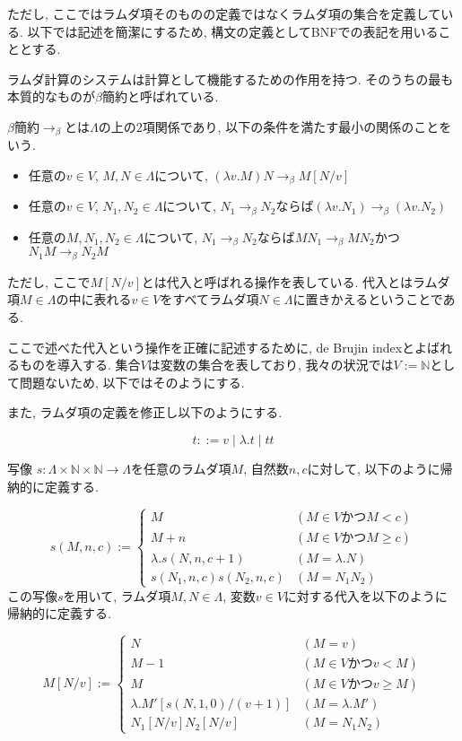 \documentclass[12pt, titlepage]{ltjsarticle}
\begin{document}
ただし, ここではラムダ項そのものの定義ではなくラムダ項の集合を定義している. 以下では記述を簡潔にするため, 構文の定義としてBNFでの表記を用いることとする.

ラムダ計算のシステムは計算として機能するための作用を持つ. そのうちの最も本質的なものが$\beta$簡約と呼ばれている.

\begin{defn}
 $\beta$簡約$\rightarrow_{\beta}$とは$\Lambda$の上の$2$項関係であり, 以下の条件を満たす最小の関係のことをいう.
 \begin{itemize}
  \item 任意の$v \in V$, $M, N \in \Lambda$について, $(\lambda v. M) N \rightarrow_\beta M[N/v]$
  \item 任意の$v \in V$, $N_1, N_2 \in \Lambda$について, $N_1 \rightarrow_\beta N_2$ならば$(\lambda v. N_1) \rightarrow_\beta (\lambda v. N_2)$
  \item 任意の$M, N_1, N_2 \in \Lambda$について, $N_1 \rightarrow_\beta N_2$ならば$M N_1 \rightarrow_\beta M N_2$かつ$N_1 M \rightarrow_\beta N_2 M$
 \end{itemize}
 ただし, ここで$M[N/v]$とは代入と呼ばれる操作を表している. 代入とはラムダ項$M \in \Lambda$の中に表れる$v \in V$をすべてラムダ項$N \in \Lambda$に置きかえるということである.
\end{defn}

ここで述べた代入という操作を正確に記述するために, de Brujin indexとよばれるものを導入する.
集合$V$は変数の集合を表しており, 我々の状況では$V := \mathbb{N}$として問題ないため, 以下ではそのようにする.

また, ラムダ項の定義を修正し以下のようにする.

\begin{defn}
 \[
 t ::= v \mid \lambda. t \mid t t
 \]
\end{defn}

\begin{defn}
 写像 $s \colon \Lambda \times \mathbb{N} \times \mathbb{N} \rightarrow \Lambda$を任意のラムダ項$M$, 自然数$n, c$に対して, 以下のように帰納的に定義する.

\[
  s (M, n, c) := \begin{cases}
    M & (M \in V \text{かつ} M < c) \\
    M + n & (M \in V \text{かつ} M \geq c) \\
    \lambda. s (N, n, c + 1) & (M = \lambda. N) \\
    s (N_1, n, c) s (N_2, n, c) & (M = N_1 N_2)
  \end{cases}
\]
 この写像$s$を用いて, ラムダ項$M, N \in \Lambda$, 変数$v \in V$に対する代入を以下のように帰納的に定義する.

\[
 M[N/v] := \begin{cases}
    N & (M = v) \\
    M - 1 & (M \in V \text{かつ} v < M) \\
    M & (M \in V \text{かつ} v \geq M) \\
    \lambda. M' [s (N, 1, 0)/(v + 1)] & (M = \lambda. M') \\
    N_1[N/v] N_2[N/v] & (M = N_1 N_2)
  \end{cases}
\]
\end{defn}
\end{document}
